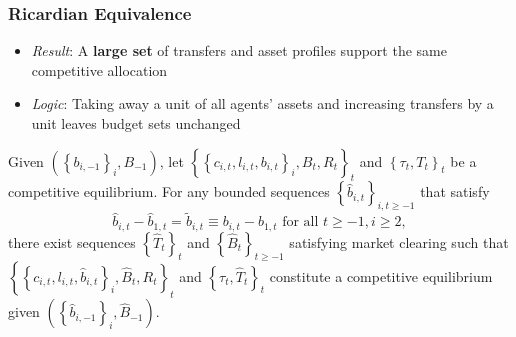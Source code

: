 \documentclass{beamer}
\begin{document}
%
%
%
%




\begin{frame}
 \frametitle{Ricardian Equivalence}
 \begin{itemize}
  \item \emph{Result}: A \textbf{large set} of transfers and asset profiles support the same competitive allocation
  \item \emph{Logic}: Taking away a unit of all agents' assets and increasing transfers by a unit leaves budget sets unchanged
 \end{itemize}
\begin{theorem}

Given $\left( \left \{ b_{i,-1}\right \}
_{i},B_{-1}\right) $, let $\left \{ \left \{ c_{i,t},l_{i,t},b_{i,t}\right \} _{i},B_{t},R_{t}\right \} _{t} $ and $\left \{ \tau _{t},T_{t}\right
\} _{t}$ be a competitive equilibrium. For any bounded sequences $%
\left \{ \hat{b}_{i,t}\right \} _{i,t\geq -1}$ that satisfy
\begin{equation*}
\hat{b}_{i,t}-\hat{b}_{1,t}=\tilde{b}_{i,t}\equiv b_{i,t}	-b_{1,t}\text{ for all }t\geq -1,i\geq 2,
\end{equation*}%
there exist  sequences $\left \{ \hat{T}_{t}\right \} _{t}$ and $%
\left \{ \hat{B}_{t}\right \} _{t\geq -1}$ satisfying market clearing such that $\left \{ \left \{ c_{i,t},l_{i,t},\hat{b}%
_{i,t}\right \} _{i},\hat{B}_{t},R_{t}\right \} _{t}$ and $\left \{
\tau _{t},\hat{T}_{t}\right \} _{t}$ constitute a competitive
equilibrium given $\left( \left \{ \hat{b}_{i,-1}\right \} _{i},\hat{B}%
_{-1}\right) $.
\end{theorem}


\end{frame}
\end{document}
